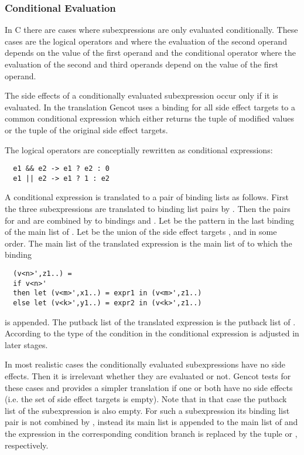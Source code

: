 \subsubsection{Conditional Evaluation}

In C there are cases where subexpressions are only evaluated conditionally. These cases are the logical operators \code{\&\&} and \code{||}
where the evaluation of the second operand depends on the value of the first operand and the conditional operator where the evaluation
of the second and third operands depend on the value of the first operand. 

The side effects of a conditionally evaluated subexpression occur only if it is evaluated. In the translation Gencot uses a binding for 
all side effect targets to a common conditional expression which either returns the tuple of modified values or the tuple of the original 
side effect targets. 

The logical operators are conceptially rewritten as conditional expressions:
\begin{verbatim}
  e1 && e2 -> e1 ? e2 : 0
  e1 || e2 -> e1 ? 1 : e2
\end{verbatim}

A conditional expression  is translated to a pair of binding lists as follows. First the three subexpressions are translated
to binding list pairs by . Then the pairs for  and  are combined by  to bindings 
 and . Let  be the pattern in the last binding of the main list 
of . Let  be the union of the side effect targets , and  in some order. The main list 
of the translated expression is the main list of  to which the binding 
\begin{verbatim}
  (v<n>',z1..) = 
  if v<n>' 
  then let (v<m>',x1..) = expr1 in (v<m>',z1..)
  else let (v<k>',y1..) = expr2 in (v<k>',z1..)
\end{verbatim}
is appended. The putback list of the translated expression is the putback list of . According to the type of  the
condition in the conditional expression is adjusted in later stages.

In most realistic cases the conditionally evaluated subexpressions have no side effects. Then it is irrelevant whether they are 
evaluated or not. Gencot tests for these cases and provides a simpler translation if one or both have no side effects (i.e. the set 
of side effect targets is empty). Note that in that case the putback list of the subexpression is also empty. For such a subexpression
its binding list pair is not combined by , instead its main list is appended to the main list of  and the 
expression in the corresponding condition branch is replaced by the tuple  or , respectively.

